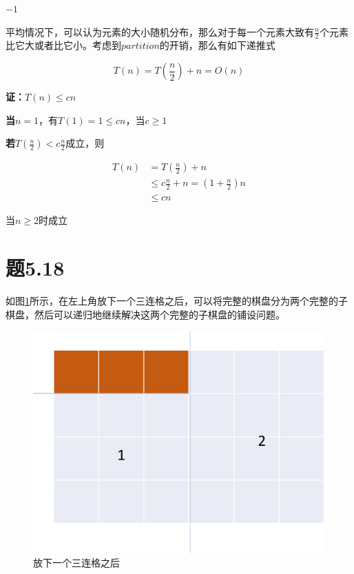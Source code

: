 \documentclass[a4paper,twoside]{article}
\begin{document}
\begin{spacing}{1.2}
\begin{algorithm}
\begin{algorithmic}[1]
	\State \Return $-1$
	\EndProcedure
\end{algorithmic}
\end{algorithm}

平均情况下，可以认为元素的大小随机分布，那么对于每一个元素大致有$\frac{n}{2}$个元素比它大或者比它小。考虑到$partition$的开销，那么有如下递推式

$$
T(n)=T(\frac{n}{2})+n=O(n)
$$

\textbf{证：}$T(n) \le cn$

\textbf{当}$n=1$，有$T(1)=1\le cn$，当$c\ge 1$

\textbf{若}$T(\frac{n}{2})<c\frac{n}{2}$成立，则

\begin{align*}
	T(n)&=T(\frac{n}{2})+n\\
	&\le c\frac{n}{2}+n =(1+\frac{n}{2})n \\
	&\le cn
\end{align*}

当$n\ge 2$时成立

\section{题5.18}


如图\ref{fig:chese}所示，在左上角放下一个三连格之后，可以将完整的棋盘分为两个完整的子棋盘，然后可以递归地继续解决这两个完整的子棋盘的铺设问题。

\begin{figure}[h]
	\centering
	\label{fig:chese}
	\caption{放下一个三连格之后}
	\includegraphics[width=0.8\linewidth]{cheseboard.png}
\end{figure}


\end{spacing}
\end{document}
